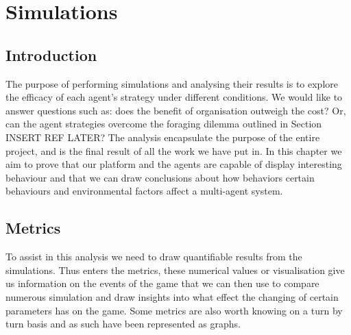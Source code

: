\chapter{Simulations}
\section{Introduction}
\label{sec:Simulations:Intro}

The purpose of performing simulations and analysing their results is to explore the efficacy of each agent's strategy under different conditions. We would like to answer questions such as: does the benefit of organisation outweigh the cost? Or, can the agent strategies overcome the foraging dilemma outlined in Section INSERT REF LATER? The analysis encapsulate the purpose of the entire project, and is the final result of all the work we have put in. In this chapter we aim to prove that our platform and the agents are capable of display interesting behaviour and that we can draw conclusions about how behaviors certain behaviours and environmental factors affect a multi-agent system.

\section{Metrics}
\label{sec:Simulations:Metric}

To assist in this analysis we need to draw quantifiable results from the simulations. Thus enters the metrics, these numerical values or visualisation give us information on the events of the game that we can then use to compare numerous simulation and draw insights into what effect the changing of certain parameters has on the game. Some metrics are also worth knowing on a turn by turn basis and as such have been represented as graphs. 


